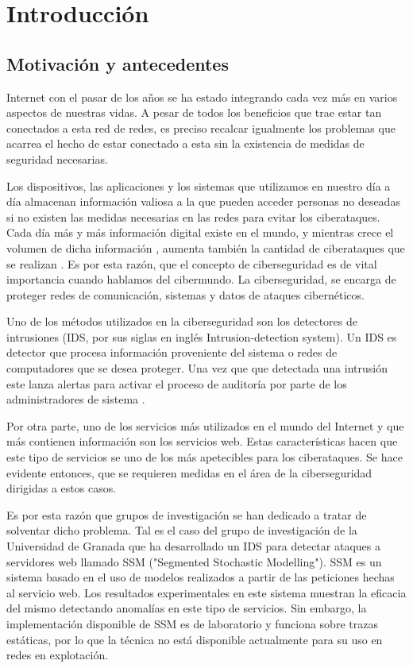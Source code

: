 \chapter{Introducción}
\label{capitulo1}

\section{Motivación y antecedentes}

Internet con el pasar de los años se ha estado integrando cada vez más en varios aspectos de nuestras vidas. A pesar de todos los beneficios que trae estar tan conectados a esta red de redes, es preciso recalcar igualmente los problemas que acarrea el hecho de estar conectado a esta sin la existencia de medidas de seguridad necesarias. 

Los dispositivos, las aplicaciones y los sistemas que utilizamos en nuestro día a día almacenan información valiosa a la que pueden acceder personas no deseadas si no existen las medidas necesarias en las redes para evitar los ciberataques. Cada día más y más información digital existe en el mundo, y mientras crece el volumen de dicha información , aumenta también la cantidad de ciberataques que se realizan \cite{pwc}. Es por esta razón, que el concepto de ciberseguridad es de vital importancia cuando hablamos del cibermundo.  La ciberseguridad, se encarga de proteger redes de comunicación, sistemas y datos de ataques cibernéticos. 

Uno de los métodos utilizados en la ciberseguridad son los detectores de intrusiones (IDS, por sus siglas en inglés Intrusion-detection system). Un IDS es detector que procesa información proveniente del sistema o redes de computadores que se desea proteger. Una vez que que detectada una intrusión este lanza alertas para activar el proceso de auditoría por parte de los administradores de sistema \cite{IDS}. 

Por otra parte, uno de los servicios más utilizados en el mundo del Internet y que más contienen información son los servicios web. Estas características hacen que este tipo de servicios se uno de los más apetecibles para los ciberataques. Se hace evidente entonces, que se requieren medidas en el área de la ciberseguridad dirigidas a estos casos.

Es por esta razón que grupos de investigación se han dedicado a tratar de solventar dicho problema. Tal es el caso del grupo de investigación de la Universidad de Granada que  ha desarrollado un IDS para detectar ataques a servidores web llamado SSM ("Segmented Stochastic Modelling"). SSM es un sistema basado en el uso de modelos realizados a partir de las peticiones hechas al servicio web. Los resultados experimentales en este sistema muestran la eficacia del mismo detectando anomalías en este tipo de servicios. Sin embargo, la implementación disponible de SSM es de laboratorio y funciona sobre trazas estáticas, por lo que la técnica no está disponible actualmente para su uso en redes en explotación.

